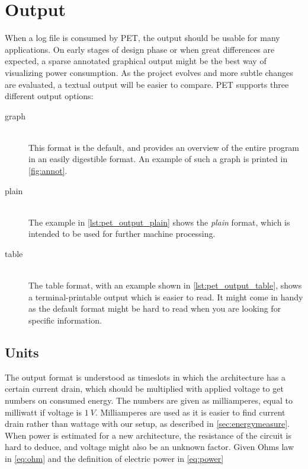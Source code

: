 \section{Output}
\label{sec:output}

When a log file is consumed by PET, the output should be usable for many
applications. On early stages of design phase or when great differences are
expected, a sparse annotated graphical output might be the best way of
visualizing power consumption. As the project evolves and more subtle changes
are evaluated, a textual output will be easier to compare. PET supports three
different output options:

\begin{description}
    \item[graph]\hfill\\
        This format is the default, and provides an overview of
        the entire program in an easily digestible format. An example of such
        a graph is printed in \autoref{fig:annot}.
    \item[plain]\hfill\\
        The example in \autoref{lst:pet_output_plain} shows the \emph{plain}
        format, which is intended to be used for further machine processing.
    \item[table]\hfill\\
        The table format, with an example shown in
        \autoref{lst:pet_output_table}, shows a terminal-printable output which
        is easier to read. It might come in handy as the default format might be
        hard to read when you are looking for specific information.
\end{description}

\subsection{Units}

The output format is understood as timeslots in which the architecture has a
certain current drain, which should be multiplied with applied voltage to get
numbers on consumed energy. The numbers are given as milliamperes, equal to
milliwatt if voltage is $1~V$. Milliamperes are used as it is easier to find
current drain rather than wattage with our setup, as described in
\autoref{sec:energymeasure}. When power is estimated for a new architecture, the
resistance of the circuit is hard to deduce, and voltage might also be an unknown
factor. Given Ohms law in \autoref{eq:ohm} and the definition of electric power
in \autoref{eq:power}

